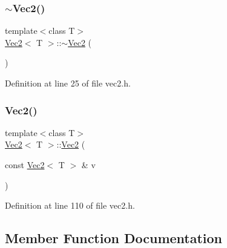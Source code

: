 \mbox{\label{class_vec2_adf180a810cb1233501a9345a4553045f}} 
\subsubsection{\texorpdfstring{$\sim$Vec2()}{~Vec2()}}
{\footnotesize\ttfamily template$<$class T$>$ \\
\mbox{\hyperlink{class_vec2}{Vec2}}$<$ T $>$\+::$\sim$\mbox{\hyperlink{class_vec2}{Vec2}} (\begin{DoxyParamCaption}{ }\end{DoxyParamCaption})\hspace{0.3cm}{\ttfamily [inline]}}



Definition at line 25 of file vec2.\+h.

\mbox{\label{class_vec2_a75d06e735d280d9812a8bc1d2ecb4e94}} 
\subsubsection{\texorpdfstring{Vec2()}{Vec2()}\hspace{0.1cm}{\footnotesize\ttfamily [5/5]}}
{\footnotesize\ttfamily template$<$class T$>$ \\
\mbox{\hyperlink{class_vec2}{Vec2}}$<$ T $>$\+::\mbox{\hyperlink{class_vec2}{Vec2}} (\begin{DoxyParamCaption}\item[{const \mbox{\hyperlink{class_vec2}{Vec2}}$<$ T $>$ \&}]{v }\end{DoxyParamCaption})\hspace{0.3cm}{\ttfamily [inline]}}



Definition at line 110 of file vec2.\+h.



\subsection{Member Function Documentation}
\mbox{\label{class_vec2_a4a2dba8465365b6f1a385d61f38f5fe0}} 
